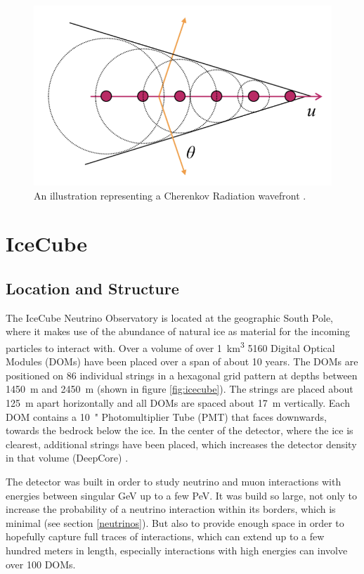 \documentclass[a4paper,10pt]{scrartcl}
\begin{document}
\begin{figure}[h]
    \includegraphics[scale=0.7]{images/cherenkov-light.png}
    \centering
    \caption{An illustration representing a Cherenkov Radiation wavefront \cite{left}.}
    \label{fig:cherenkovlight}
\end{figure}


\section{IceCube}

\subsection{Location and Structure}

The IceCube Neutrino Observatory is located at the geographic South Pole, where it makes use of the abundance of natural ice as material for the incoming particles to interact with.
Over a volume of over \SI{1}{km^3} 5160 Digital Optical Modules (DOMs) have been placed over a span of about 10 years.
The DOMs are positioned on 86 individual strings in a hexagonal grid pattern at depths between \SI{1450}{m} and \SI{2450}{m} (shown in figure \ref{fig:icecube}).
The strings are placed about \SI{125}{m} apart horizontally and all DOMs are spaced about \SI{17}{m} vertically.
Each DOM contains a \SI{10}{"} Photomultiplier Tube (PMT) that faces downwards, towards the bedrock below the ice.
In the center of the detector, where the ice is clearest, additional strings have been placed, which increases the detector density in that volume (DeepCore) \cite{icecube}.

The detector was built in order to study neutrino and muon interactions with energies between singular GeV up to a few PeV.
It was build so large, not only to increase the probability of a neutrino interaction within its borders, which is minimal (see section \ref{neutrinos}).
But also to provide enough space in order to hopefully capture full traces of interactions, which can extend up to a few hundred meters in length, especially interactions with high energies can involve over 100 DOMs.
\end{document}

